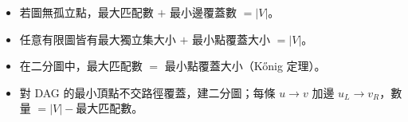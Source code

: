 \begin{itemize}
	\item 若圖無孤立點，最大匹配數 $+$ 最小邊覆蓋數 $= |V|$。
	\item 任意有限圖皆有最大獨立集大小 $+$ 最小點覆蓋大小 $= |V|$。
	\item 在二分圖中，最大匹配數 $=$ 最小點覆蓋大小（Kőnig 定理）。
	\item 對 DAG 的最小頂點不交路徑覆蓋，建二分圖；每條 $u\to v$ 加邊 $u_L\to v_R$，數量 $=|V|-\text{最大匹配數}$。
\end{itemize}
